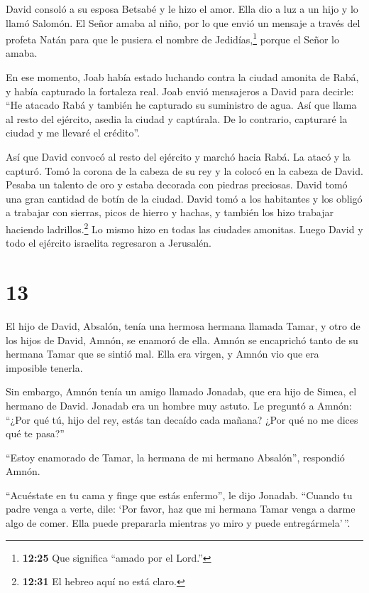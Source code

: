  David consoló a su esposa Betsabé y le hizo el amor. Ella
dio a luz a un hijo y lo llamó Salomón. El Señor amaba al niño,
 por lo que envió un mensaje a través del profeta Natán
para que le pusiera el nombre de Jedidías,\footnote{\textbf{12:25} Que
  significa ``amado por el Lord.''} porque el Señor lo amaba.

 En ese momento, Joab había estado luchando contra la
ciudad amonita de Rabá, y había capturado la fortaleza real.
 Joab envió mensajeros a David para decirle: ``He atacado
Rabá y también he capturado su suministro de agua.  Así que
llama al resto del ejército, asedia la ciudad y captúrala. De lo
contrario, capturaré la ciudad y me llevaré el crédito''.

 Así que David convocó al resto del ejército y marchó hacia
Rabá. La atacó y la capturó.  Tomó la corona de la cabeza
de su rey y la colocó en la cabeza de David. Pesaba un talento de oro y
estaba decorada con piedras preciosas. David tomó una gran cantidad de
botín de la ciudad.  David tomó a los habitantes y los
obligó a trabajar con sierras, picos de hierro y hachas, y también los
hizo trabajar haciendo ladrillos.\footnote{\textbf{12:31} El hebreo aquí
  no está claro.} Lo mismo hizo en todas las ciudades amonitas. Luego
David y todo el ejército israelita regresaron a Jerusalén.

\hypertarget{section-12}{%
\section{13}\label{section-12}}

 El hijo de David, Absalón, tenía una hermosa hermana
llamada Tamar, y otro de los hijos de David, Amnón, se enamoró de ella.
 Amnón se encaprichó tanto de su hermana Tamar que se sintió
mal. Ella era virgen, y Amnón vio que era imposible tenerla.

 Sin embargo, Amnón tenía un amigo llamado Jonadab, que era
hijo de Simea, el hermano de David. Jonadab era un hombre muy astuto.
 Le preguntó a Amnón: ``¿Por qué tú, hijo del rey, estás tan
decaído cada mañana? ¿Por qué no me dices qué te pasa?''

``Estoy enamorado de Tamar, la hermana de mi hermano Absalón'',
respondió Amnón.

 ``Acuéstate en tu cama y finge que estás enfermo'', le dijo
Jonadab. ``Cuando tu padre venga a verte, dile: `Por favor, haz que mi
hermana Tamar venga a darme algo de comer. Ella puede prepararla
mientras yo miro y puede entregármela'\,''.

